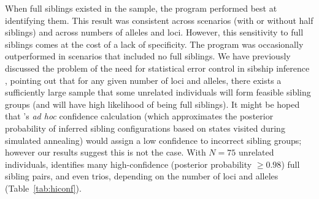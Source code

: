 When full siblings existed in the sample, the program \colony{} performed best at identifying them.  
This result was consistent across scenarios (with or without half siblings) and across numbers of 
alleles and loci.  However, this sensitivity to full siblings comes at the cost of a lack of 
specificity.  The program \colony{} was occasionally outperformed in scenarios that included no full 
siblings.  We have previously discussed the problem of the need for statistical error control in 
sibship inference \citep{alm&and11}, pointing out that for any given number of loci and alleles, there 
exists a sufficiently large sample that some unrelated individuals will form feasible sibling groups 
(and will have high likelihood of being full siblings).  It might be hoped that \colony{}'s {\em ad 
hoc} confidence calculation (which approximates the posterior probability of inferred sibling 
configurations based on states visited during simulated annealing) would assign a low confidence to 
incorrect sibling groups; however our results suggest this is not the case. With $N=75$ unrelated 
individuals, \colony{} identifies many high-confidence (posterior probability $\geq 0.98$) full sibling 
pairs, and even trios, depending on the number of loci and alleles (Table~\ref{tab:hiconf}).
